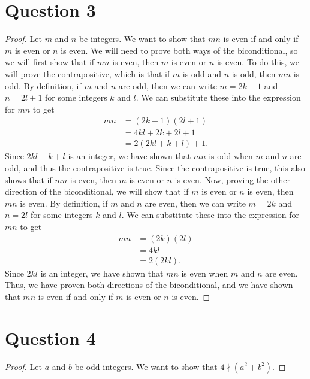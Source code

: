 \documentclass{article}
\begin{document}
\section*{Question 3}
\begin{proof}
    Let $m$ and $n$ be integers.
    We want to show that $mn$ is even if and only if $m$ is even or $n$ is even.
    We will need to prove both ways of the biconditional, so we will first show that 
    if $mn$ is even, then $m$ is even or $n$ is even.
    To do this, we will prove the contrapositive, which is that if $m$ is odd and $n$ is odd, then $mn$ is odd.
    By definition, if $m$ and $n$ are odd, then we can write $m = 2k + 1$ and $n = 2l + 1$ for some integers $k$ and $l$.
    We can substitute these into the expression for $mn$ to get
    \begin{align*}
        mn &= (2k + 1)(2l + 1) \\
        &= 4kl + 2k + 2l + 1 \\
        &= 2(2kl + k + l) + 1.
    \end{align*}
    Since $2kl + k + l$ is an integer, we have shown that $mn$ is odd when $m$ and $n$ are odd,
    and thus the contrapositive is true.
    Since the contrapositive is true, this also shows that if $mn$ is even, then $m$ is even or $n$ is even.
    Now, proving the other direction of the biconditional, we will show that if $m$ is even or $n$ is even, then $mn$ is even.
    By definition, if $m$ and $n$ are even, then we can write $m = 2k$ and $n = 2l$ for some integers $k$ and $l$.
    We can substitute these into the expression for $mn$ to get
    \begin{align*}
        mn &= (2k)(2l) \\
        &= 4kl \\
        &= 2(2kl).
    \end{align*}
    Since $2kl$ is an integer, we have shown that $mn$ is even when $m$ and $n$ are even.
    Thus, we have proven both directions of the biconditional, and we have shown that $mn$ is even if and only if $m$ is even or $n$ is even.
\end{proof}

\section*{Question 4}
\begin{proof}
    Let $a$ and $b$ be odd integers.
    We want to show that $4 \nmid (a^2 + b^2)$.
\end{proof}
\end{document}
